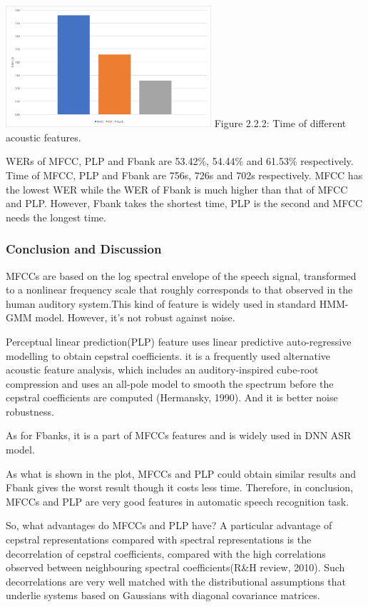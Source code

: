 \documentclass[]{article}
\begin{document}
\begin{multicols*}{2}
\begin{center}
\includegraphics[width=3in]{Picture1.png} 
Figure 2.2.2: Time of different acoustic features.
\end{center}

WERs of MFCC, PLP and Fbank are 53.42\%, 54.44\% and 61.53\% respectively. Time of MFCC, PLP and Fbank are 756s, 726s and 702s respectively. MFCC has the lowest WER while the WER of Fbank is much higher than that of MFCC and PLP. However, Fbank takes the shortest time, PLP is the second and MFCC needs the longest time.

\subsubsection{Conclusion and Discussion}

MFCCs are based on the log spectral envelope of the speech signal, transformed to a nonlinear frequency scale that roughly corresponds to that observed in the human auditory system.This kind of feature is widely used in standard HMM-GMM model. However, it's not robust against noise.

Perceptual linear prediction(PLP) feature uses linear predictive auto-regressive modelling to obtain cepstral coefficients. it is a frequently used alternative acoustic feature analysis, which  includes an auditory-inspired cube-root compression and uses an all-pole model to smooth the spectrum before the cepstral coefficients are computed (Hermansky, 1990). And it is better noise robustness.

As for Fbanks, it is a part of MFCCs features and is widely used in DNN ASR model.

As what is shown in the plot, MFCCs and PLP could obtain similar results and Fbank gives the worst result though it costs less time. Therefore, in conclusion, MFCCs and PLP are very good features in automatic speech recognition task.

So, what advantages do MFCCs and PLP have? A particular advantage of cepstral representations compared with spectral representations is the decorrelation of cepstral  coefficients,  compared  with  the  high  correlations  observed  between neighbouring spectral coefficients(R\&H review, 2010). Such decorrelations are very well matched with the distributional assumptions that underlie systems based on Gaussians with diagonal covariance matrices.


\end{multicols*}
\end{document}
